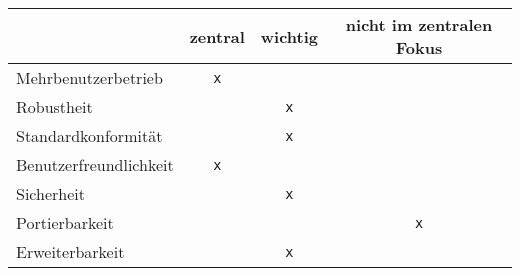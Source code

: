 
\begin{table}[H]
	\centering
	\begin{tabular}{lccc}
		\toprule
		& zentral & wichtig & nicht im zentralen Fokus \\
		\midrule
		Mehrbenutzerbetrieb & \texttt{x} & & \\
		Robustheit & & \texttt{x} & \\
		Standardkonformität & & \texttt{x} & \\
		Benutzerfreundlichkeit & \texttt{x} & & \\
		Sicherheit & &  \texttt{x} & \\
		Portierbarkeit & & & \texttt{x} \\
		Erweiterbarkeit & & \texttt{x} &  \\
		\bottomrule
	\end{tabular}
\end{table}